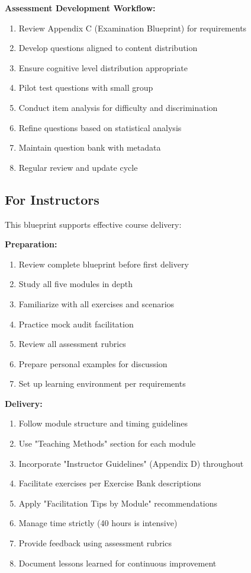 \documentclass[11pt,a4paper]{article}
\begin{document}
\textbf{Assessment Development Workflow:}
\begin{enumerate}
\item Review Appendix C (Examination Blueprint) for requirements
\item Develop questions aligned to content distribution
\item Ensure cognitive level distribution appropriate
\item Pilot test questions with small group
\item Conduct item analysis for difficulty and discrimination
\item Refine questions based on statistical analysis
\item Maintain question bank with metadata
\item Regular review and update cycle
\end{enumerate}

\subsection{For Instructors}

This blueprint supports effective course delivery:

\textbf{Preparation:}
\begin{enumerate}
\item Review complete blueprint before first delivery
\item Study all five modules in depth
\item Familiarize with all exercises and scenarios
\item Practice mock audit facilitation
\item Review all assessment rubrics
\item Prepare personal examples for discussion
\item Set up learning environment per requirements
\end{enumerate}

\textbf{Delivery:}
\begin{enumerate}
\item Follow module structure and timing guidelines
\item Use "Teaching Methods" section for each module
\item Incorporate "Instructor Guidelines" (Appendix D) throughout
\item Facilitate exercises per Exercise Bank descriptions
\item Apply "Facilitation Tips by Module" recommendations
\item Manage time strictly (40 hours is intensive)
\item Provide feedback using assessment rubrics
\item Document lessons learned for continuous improvement
\end{enumerate}
\end{document}
